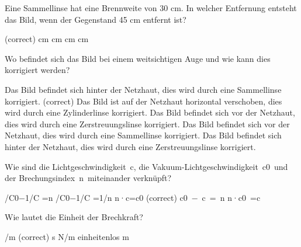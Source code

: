 \documentclass[11pt]{exam}
\begin{document}
\setlength{\voffset}{-0.5in}
\setlength{\headsep}{5pt}

\hspace{2mm}
 \hspace{5mm}
\vspace{4mm}

\begin{questions}

\question Eine Sammellinse hat eine Brennweite von 30 cm. In welcher Entfernung entsteht das Bild, wenn der Gegenstand 45 cm entfernt ist?

\begin{choices}
	\choice 90cm (correct)
	 cm
	 cm
	 cm
	 cm
\end{choices}

\vspace{3mm}\question Wo befindet sich das Bild bei einem weitsichtigen Auge und wie kann dies korrigiert werden?

\begin{choices}
	\choice Das Bild befindet sich hinter der Netzhaut, dies wird durch eine Sammellinse korrigiert. (correct)
	\choice Das Bild ist auf der Netzhaut horizontal verschoben, dies wird durch eine Zylinderlinse korrigiert.
	\choice Das Bild befindet sich vor der Netzhaut, dies wird durch eine Zerstreuungslinse korrigiert.
	\choice Das Bild befindet sich vor der Netzhaut, dies wird durch eine Sammellinse korrigiert.
	\choice Das Bild befindet sich hinter der Netzhaut, dies wird durch eine Zerstreuungslinse korrigiert.
\end{choices}

\vspace{3mm}\question Wie sind die Lichtgeschwindigkeit c, die Vakuum-Lichtgeschwindigkeit c0 und der Brechungsindex n miteinander verknüpft?

\begin{choices}
	 /C0−1/C =n
	 /C0−1/C =1/n
	\choice n·c=c0 (correct)
	\choice c0 − c = n
	\choice n·c0 =c
\end{choices}

\vspace{3mm}\question Wie lautet die Einheit der Brechkraft?

\begin{choices}
	/m (correct)
	\choice s
	\choice N/m
	\choice einheitenlos
	\choice m
\end{choices}


\end{questions}
\end{document}
